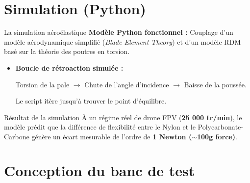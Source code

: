 \documentclass[aspectratio=169]{beamer}
\begin{document}
\section{Simulation (Python)}

\begin{frame}{La simulation aéroélastique}
  \textbf{Modèle Python fonctionnel :} Couplage d'un modèle aérodynamique simplifié (\textit{Blade Element Theory}) et d'un \alert{modèle RDM} basé sur la théorie des poutres en torsion.

  \vspace{0.2cm}
  \begin{itemize}
    \item \textbf{Boucle de rétroaction simulée :}
      \begin{center}
        Torsion de la pale $\rightarrow$ Chute de l'angle d'incidence $\rightarrow$ Baisse de la poussée.
      \end{center}
      Le script itère jusqu'à trouver le point d'équilibre.
  \end{itemize}

  \vspace{0.2cm}
  \begin{alertblock}{Résultat de la simulation}
    À un régime réel de drone FPV (\textbf{25 000 tr/min}), le modèle prédit que la différence de flexibilité entre le Nylon et le Polycarbonate-Carbone génère un écart mesurable de l'ordre de \textbf{1 Newton ($\sim$100g force)}.
  \end{alertblock}
\end{frame}

\section{Conception du banc de test}
\end{document}
